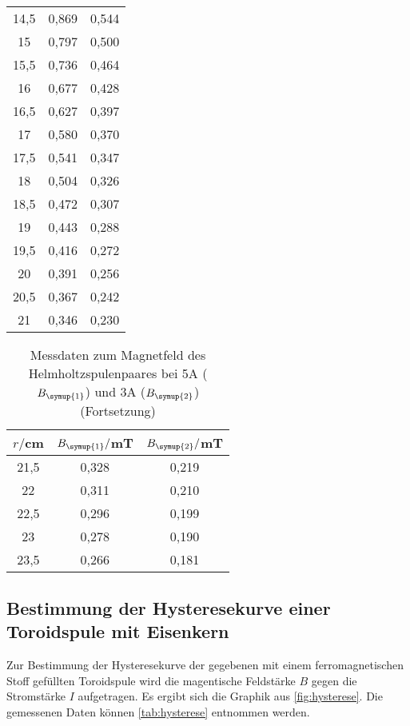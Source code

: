 \begin{table}
\begin{tabular}{c c c}
    14,5	&  0,869 & 0,544\\
    15	  &  0,797 & 0,500\\
    15,5	&  0,736 & 0,464\\
    16	  &  0,677 & 0,428\\
    16,5	&  0,627 & 0,397\\
    17	  &  0,580 & 0,370\\
    17,5	&  0,541 & 0,347\\
    18	  &  0,504 & 0,326\\
    18,5	&  0,472 & 0,307\\
    19	  &  0,443 & 0,288\\
    19,5	&  0,416 & 0,272\\
    20	  &  0,391 & 0,256\\
    20,5	&  0,367 & 0,242\\
    21	  &  0,346 & 0,230\\
    \bottomrule
  \end{tabular}
\end{table}

\begin{table}
  \centering
  \caption{Messdaten zum Magnetfeld des Helmholtzspulenpaares bei 5A ($B_{\symup{1}}$)
  und 3A ($B_{\symup{2}}$)(Fortsetzung)}
  \label{tab:helmholtz}
  \begin{tabular}{c c c}
    \toprule
    $r/$cm & $B_{\symup{1}}/$mT & $B_{\symup{2}}/$mT\\
    \midrule
    21,5	&  0,328 & 0,219\\
    22	  &  0,311 & 0,210\\
    22,5	&  0,296 & 0,199\\
    23	  &  0,278 & 0,190\\
    23,5	&  0,266 & 0,181\\
    \bottomrule
  \end{tabular}
\end{table}


\newpage
\subsection{Bestimmung der Hysteresekurve einer Toroidspule mit Eisenkern}

Zur Bestimmung der Hysteresekurve der gegebenen mit einem ferromagnetischen Stoff
gefüllten Toroidspule wird die magentische Feldstärke $B$ gegen die Stromstärke
$I$ aufgetragen. Es ergibt sich die Graphik aus \ref{fig:hysterese}. Die gemessenen
Daten können \ref{tab:hysterese} entnommen werden.

